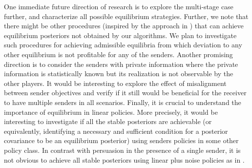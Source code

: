 \documentclass[12pt,journal,onecolumn]{IEEEtran}
\newtheorem{lemma}{Lemma}
\newenvironment{Proof}[1]{\medskip\par\noindent{\bf Proof:\,}\,#1}{{\mbox{\,$\blacksquare$}\par}}
\begin{document}
One immediate future direction of research is to explore the multi-stage case further, and characterize all possible %
equilibrium strategies. Further, we note that there might be other procedures (inspired by the approach in \cite{tamura2018bayesian}) that can achieve equilibrium posteriors not obtained by our algorithms. We plan to investigate such procedures for achieving admissible equilibria\cite{bacsar1998dynamic} from which deviation to any other equilibrium is not profitable for any of the senders. Another promising direction is to consider the senders with private information where the private information is statistically known but its realization is not observable by the other players. It would be interesting to explore the effect of misalignment between sender objectives and verify if it still would be beneficial for the receiver to have multiple senders in all scenarios. Finally, it is crucial to understand the importance of equilibrium in linear policies. More precisely, it would be interesting to investigate if all the stable posteriors are achievable (or equivalently, identifying a necessary and sufficient condition for a posterior covariance to be an equilibrium posterior) using senders policies in some other policy class. In contrast with persuasion in the presence of a single sender, it is not obvious to achieve all stable posteriors using linear plus noise policies as in \cite{9222530}. 

\end{document}
